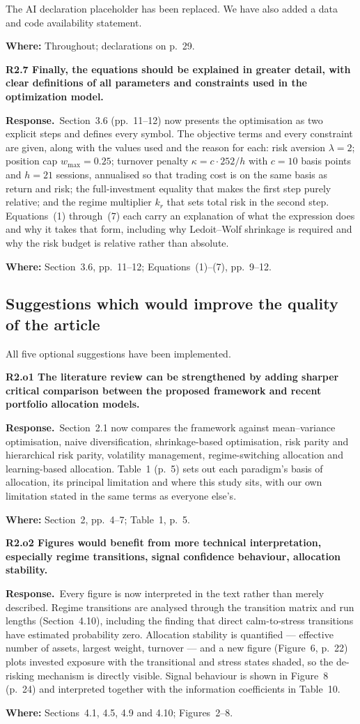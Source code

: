 \documentclass[11pt,a4paper]{article}
\newcommand{\rc}[1]{\par\medskip\noindent\textbf{#1}\par\nopagebreak}
\newcommand{\resp}{\par\noindent\textbf{Response.}\ }
\newcommand{\where}[1]{\par\smallskip\noindent\textcolor{blue!55!black}{\textbf{Where:} #1}\par}
\begin{document}
The AI declaration placeholder has been replaced. We have also added a data and code
availability statement.
\where{Throughout; declarations on p.~29.}

\rc{R2.7 Finally, the equations should be explained in greater detail, with clear
definitions of all parameters and constraints used in the optimization model.}

\resp Section~3.6 (pp.~11--12) now presents the optimisation as two explicit steps and
defines every symbol. The objective terms and every constraint are given, along with the
values used and the reason for each: risk aversion $\lambda = 2$; position cap
$w_{\max} = 0.25$; turnover penalty $\kappa = c \cdot 252 / h$ with $c = 10$ basis points
and $h = 21$ sessions, annualised so that trading cost is on the same basis as return
and risk; the full-investment equality that makes the first step purely relative; and
the regime multiplier $k_r$ that sets total risk in the second step. Equations~(1)
through~(7) each carry an explanation of what the expression does and why it takes that
form, including why Ledoit--Wolf shrinkage is required and why the risk budget is
relative rather than absolute.
\where{Section~3.6, pp.~11--12; Equations~(1)--(7), pp.~9--12.}

\subsection*{Suggestions which would improve the quality of the article}

All five optional suggestions have been implemented.

\rc{R2.o1 The literature review can be strengthened by adding sharper critical
comparison between the proposed framework and recent portfolio allocation models.}

\resp Section~2.1 now compares the framework against mean--variance optimisation, naive
diversification, shrinkage-based optimisation, risk parity and hierarchical risk parity,
volatility management, regime-switching allocation and learning-based allocation.
Table~1 (p.~5) sets out each paradigm's basis of allocation, its principal limitation
and where this study sits, with our own limitation stated in the same terms as everyone
else's.
\where{Section~2, pp.~4--7; Table~1, p.~5.}

\rc{R2.o2 Figures would benefit from more technical interpretation, especially regime
transitions, signal confidence behaviour, allocation stability.}

\resp Every figure is now interpreted in the text rather than merely described.
Regime transitions are analysed through the transition matrix and run lengths
(Section~4.10), including the finding that direct calm-to-stress transitions have
estimated probability zero. Allocation stability is quantified --- effective number of
assets, largest weight, turnover --- and a new figure (Figure~6, p.~22) plots invested
exposure with the transitional and stress states shaded, so the de-risking mechanism is
directly visible. Signal behaviour is shown in Figure~8 (p.~24) and interpreted together
with the information coefficients in Table~10.
\where{Sections~4.1, 4.5, 4.9 and 4.10; Figures~2--8.}
\end{document}
